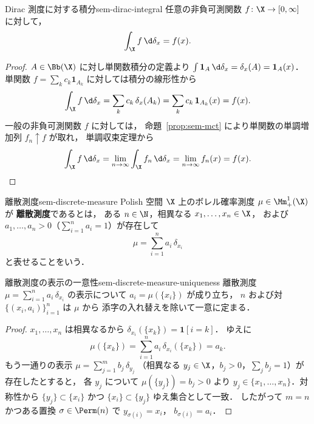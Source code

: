 \begin{claim}{Dirac 測度に対する積分}{sem-dirac-integral}
  任意の非負可測関数 $f \colon \X \to [0, \infty]$ に対して，
  \[
    \int_\X f \, \d\delta_x = f(x).
  \]
\end{claim}

\begin{proof}
  $A \in \Bb(\X)$ に対し単関数積分の定義より
  $\int \mathbf{1}_A \, \d\delta_x = \delta_x(A) = \mathbf{1}_A(x)$．
  単関数 $f = \sum_k c_k \mathbf{1}_{A_k}$ に対しては積分の線形性から
  \[
    \int_\X f \, \d\delta_x
    = \sum_k c_k \, \delta_x(A_k)
    = \sum_k c_k \, \mathbf{1}_{A_k}(x)
    = f(x).
  \]
  一般の非負可測関数 $f$ に対しては，
  命題~\ref{prop:sem-mct} により単関数の単調増加列 $f_n \uparrow f$ が取れ，
  単調収束定理から
  \[
    \int_\X f \, \d\delta_x
    = \lim_{n \to \infty} \int_\X f_n \, \d\delta_x
    = \lim_{n \to \infty} f_n(x)
    = f(x).
  \]
\end{proof}

\begin{definition}{離散測度}{sem-discrete-measure}
  Polish 空間 $\X$ 上のボレル確率測度 $\mu \in \Mm_+^1(\X)$ が
  \textbf{離散測度}であるとは，
  ある $n \in \N$，相異なる $x_1, \ldots, x_n \in \X$，
  および $a_1, \ldots, a_n > 0$（$\sum_{i=1}^n a_i = 1$）が存在して
  \[
    \mu = \sum_{i=1}^{n} a_i\, \delta_{x_i}
  \]
  と表せることをいう．
\end{definition}

\begin{claim}{離散測度の表示の一意性}{sem-discrete-measure-uniqueness}
  離散測度 $\mu = \sum_{i=1}^{n} a_i\, \delta_{x_i}$ の表示について
  $a_i = \mu(\{x_i\})$ が成り立ち，
  $n$ および対 $\{(x_i, a_i)\}_{i=1}^{n}$ は $\mu$ から
  添字の入れ替えを除いて一意に定まる．
\end{claim}

\begin{proof}
  $x_1, \ldots, x_n$ は相異なるから
  $\delta_{x_i}(\{x_k\}) = \mathbf{1}[i = k]$．
  ゆえに
  \[
    \mu(\{x_k\}) = \sum_{i=1}^{n} a_i\, \delta_{x_i}(\{x_k\}) = a_k.
  \]
  もう一通りの表示
  $\mu = \sum_{j=1}^{m} b_j\, \delta_{y_j}$
  （相異なる $y_j \in \X$，$b_j > 0$，$\sum_j b_j = 1$）が存在したとすると，
  各 $y_j$ について $\mu(\{y_j\}) = b_j > 0$ より
  $y_j \in \{x_1, \ldots, x_n\}$．対称性から $\{y_j\} \subset \{x_i\}$ かつ
  $\{x_i\} \subset \{y_j\}$ ゆえ集合として一致．
  したがって $m = n$ かつある置換 $\sigma \in \Perm(n)$ で $y_{\sigma(i)} = x_i$，
  $b_{\sigma(i)} = a_i$．
\end{proof}

